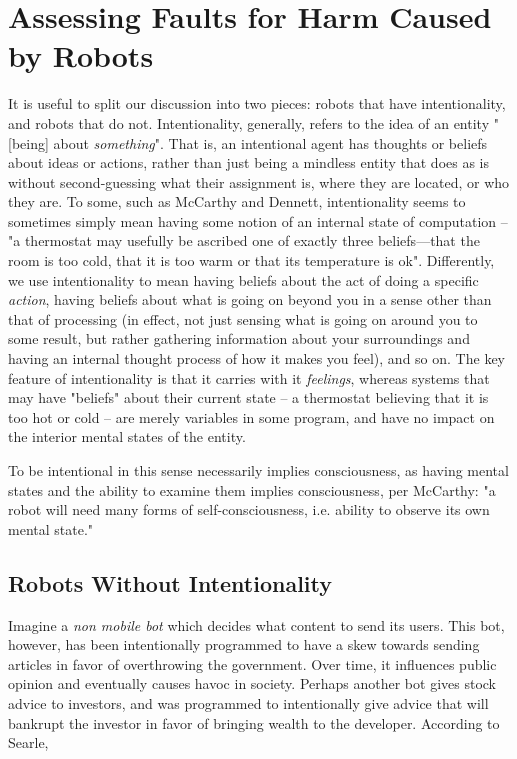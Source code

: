\documentclass[12]{article}
\begin{document}
\section{Assessing Faults for Harm Caused by Robots}
	It is useful to split our discussion into two pieces: robots that have intentionality, and robots that do not. Intentionality, generally, refers to the idea of an entity "[being] about \textit{something}"\cite{intentionality}. That is, an intentional agent has thoughts or beliefs about ideas or actions, rather than just being a mindless entity that does as is without second-guessing what their assignment is, where they are located, or who they are. To some, such as McCarthy and Dennett\cite{mccarthy,dennet}, intentionality seems to sometimes simply mean having some notion of an internal state of computation -- "a thermostat may usefully be ascribed one of exactly three beliefs—that the room is too cold, that it is too warm or that its temperature is ok"\cite{mccarthy}. Differently, we use intentionality to mean having beliefs about the act of doing a specific \textit{action}, having beliefs about what is going on beyond you in a sense other than that of processing (in effect, not just sensing what is going on around you to some result, but rather gathering information about your surroundings and having an internal thought process of how it makes you feel), and so on. The key feature of intentionality is that it carries with it \textit{feelings}, whereas systems that may have "beliefs" about their current state -- a thermostat believing that it is too hot or cold -- are merely variables in some program, and have no impact on the interior mental states of the entity. 
	
	 To be intentional in this sense necessarily implies consciousness, as having mental states and the ability to examine them implies consciousness, per McCarthy: "a robot will need many forms of self-consciousness, i.e. ability to observe its own mental state."\cite{mccarthy}  

	\subsection{Robots Without Intentionality}
		Imagine a \textit{non mobile bot} which decides what content to send its users. This bot, however, has been intentionally programmed to have a skew towards sending articles in favor of overthrowing the government. Over time, it influences public opinion and eventually causes havoc in society. Perhaps another bot gives stock advice to investors, and was programmed to intentionally give advice that will bankrupt the investor in favor of bringing wealth to the developer. According to Searle\cite{chineseroom1, chineseroom2},
	
\end{document}
